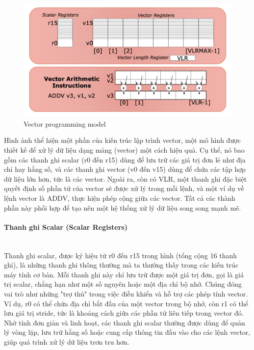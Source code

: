 \documentclass[a4paper]{article}
\begin{document}
\begin{figure}[H]
     \centering
     \includegraphics[scale =0.4]{assets/vector-programming-model.png}
     \caption{Vector programming model}
     \label{fig:2ss}
 \end{figure}

 Hình ảnh thể hiện một phần của kiến trúc lập trình vector, một mô hình được thiết kế để xử lý dữ liệu dạng mảng (vector) một cách hiệu quả. Cụ thể, nó bao gồm các thanh ghi scalar (r0 đến r15) dùng để lưu trữ các giá trị đơn lẻ như địa chỉ hay hằng số, và các thanh ghi vector (v0 đến v15) dùng để chứa các tập hợp dữ liệu lớn hơn, tức là các vector. Ngoài ra, còn có VLR, một thanh ghi đặc biệt quyết định số phần tử của vector sẽ được xử lý trong mỗi lệnh, và một ví dụ về lệnh vector là ADDV, thực hiện phép cộng giữa các vector. Tất cả các thành phần này phối hợp để tạo nên một hệ thống xử lý dữ liệu song song mạnh mẽ.

\paragraph{Thanh ghi Scalar (Scalar Registers)}\leavevmode\\

Thanh ghi scalar, được ký hiệu từ r0 đến r15 trong hình (tổng cộng 16 thanh ghi), là những thanh ghi thông thường mà ta thường thấy trong các kiến trúc máy tính cơ bản. Mỗi thanh ghi này chỉ lưu trữ được một giá trị đơn, gọi là giá trị scalar, chẳng hạn như một số nguyên hoặc một địa chỉ bộ nhớ. Chúng đóng vai trò như những "trợ thủ" trong việc điều khiển và hỗ trợ các phép tính vector. Ví dụ, r0 có thể chứa địa chỉ bắt đầu của một vector trong bộ nhớ, còn r1 có thể lưu giá trị stride, tức là khoảng cách giữa các phần tử liên tiếp trong vector đó. Nhờ tính đơn giản và linh hoạt, các thanh ghi scalar thường được dùng để quản lý vòng lặp, lưu trữ hằng số hoặc cung cấp thông tin đầu vào cho các lệnh vector, giúp quá trình xử lý dữ liệu trơn tru hơn.
\end{document}
